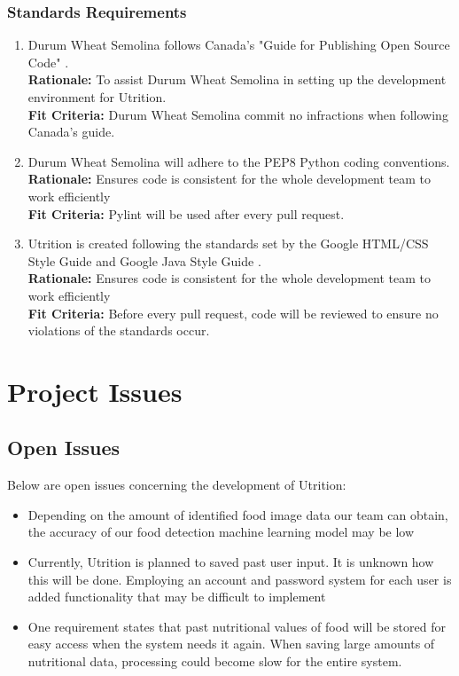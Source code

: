 \documentclass[12pt]{article}
\begin{document}
\subsubsection{Standards Requirements}
\begin{enumerate}[start=2,label={LR\arabic*.}]
	\item Durum Wheat Semolina follows Canada's "Guide for Publishing Open Source 
	Code" \citep{CanadianCode}.\\
	\textbf{Rationale:} To assist Durum Wheat Semolina in setting up the development environment for Utrition.\\
	\textbf{Fit Criteria:} Durum Wheat Semolina commit no infractions when following Canada’s guide.
	\item Durum Wheat Semolina will adhere to the PEP8 Python coding conventions.\\
	\textbf{Rationale:} Ensures code is consistent for the whole development team to work efficiently \\
	\textbf{Fit Criteria:} Pylint will be used after every pull request.
	\item Utrition is created following the standards set by the Google HTML/CSS Style Guide \citep{HTMLCSSStyle} and Google Java Style Guide \citep{JavaStyle}. \\
	\textbf{Rationale:} Ensures code is consistent for the whole development team to work efficiently \\
	\textbf{Fit Criteria:} Before every pull request, code will be reviewed to ensure no violations of the standards occur.
\end{enumerate}

\section{Project Issues}

\subsection{Open Issues}
Below are open issues concerning the development of Utrition:
\begin{itemize}
	\item Depending on the amount of identified food image data our team can obtain, the accuracy of our food detection machine learning model may be low
	\item Currently, Utrition is planned to saved past user input. It is unknown how this will be done. Employing an account and password system for each user is added functionality that may be difficult to implement 
	\item One requirement states that past nutritional values of food will be stored for easy access when the system needs it again. When saving large amounts of nutritional data, processing could become slow for the entire system.
\end{itemize}
\end{document}
